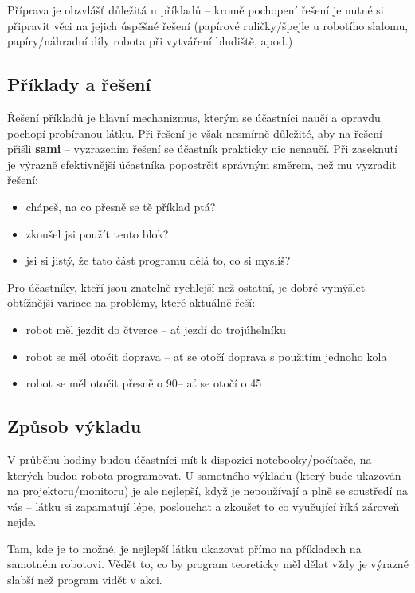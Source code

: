 Příprava je obzvlášť důležitá u příkladů -- kromě pochopení řešení je nutné si připravit věci na jejich úspěšné řešení (papírové ruličky/špejle u robotího slalomu, papíry/náhradní díly robota při vytváření bludiště, apod.)

\subsection{Příklady a řešení}
Řešení příkladů je hlavní mechanizmus, kterým se účastníci naučí a opravdu pochopí probíranou látku. Při řešení je však nesmírně důležité, aby na řešení přišli \textbf{sami} -- vyzrazením řešení se účastník prakticky nic nenaučí. Při zaseknutí je výrazně efektivnější účastníka popostrčit správným směrem, než mu vyzradit řešení:
\begin{itemize}
	\item chápeš, na co přesně se tě příklad ptá?
	\item zkoušel jsi použít tento blok?
	\item jsi si jistý, že tato část programu dělá to, co si myslíš?
\end{itemize}

\vspace{\baselineskip}

Pro účastníky, kteří jsou znatelně rychlejší než ostatní, je dobré vymýšlet obtížnější variace na problémy, které aktuálně řeší:
\begin{itemize}
	\item robot měl jezdit do čtverce -- ať jezdí do trojúhelníku
	\item robot se měl otočit doprava -- ať se otočí doprava s použitím jednoho kola
	\item robot se měl otočit přesně o 90\degree -- ať se otočí o 45\degree
\end{itemize}

\subsection{Způsob výkladu}
V průběhu hodiny budou účastníci mít k dispozici notebooky/počítače, na kterých budou robota programovat. U samotného výkladu (který bude ukazován na projektoru/monitoru) je ale nejlepší, když je nepoužívají a plně se soustředí na vás -- látku si zapamatují lépe, poslouchat a zkoušet to co vyučující říká zároveň nejde.

Tam, kde je to možné, je nejlepší látku ukazovat přímo na příkladech na samotném robotovi. Vědět to, co by program teoreticky měl dělat vždy je výrazně slabší než program vidět v akci.

